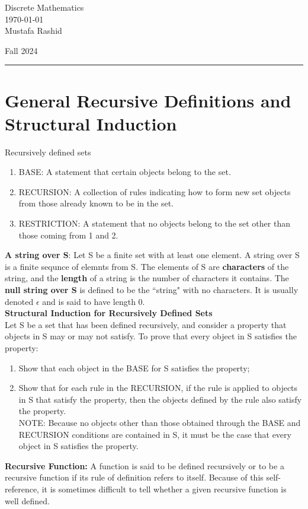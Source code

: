\documentclass[12pt,letterpaper, onecolumn]{exam}
\begin{document}
\begingroup  
\noindent\LARGE Discrete Mathematics\\
\noindent\large \today\\
\noindent\large Mustafa Rashid\par
\noindent\large Fall 2024\par
\endgroup
\rule{\textwidth}{0.4pt}
\pointsdroppedatright
\printanswers
\renewcommand{\solutiontitle}{\noindent\textbf{Ans:}\enspace}  


	\section{General Recursive Definitions and Structural Induction}
	Recursively defined sets 
	\begin{enumerate}
		\item BASE: A statement that certain objects belong to the set.
		\item RECURSION: A collection of rules indicating how to form new set objects from those already known to be in the set.
		\item RESTRICTION: A statement that no objects belong to the set other than those coming from 1 and 2.
	\end{enumerate}
	\textbf{A string over S}: Let S be a finite set with at least one element. A string over S is a finite sequnce of elemnts from S. The elements of S are \textbf{characters} of the string, and the \textbf{length} of a string is the number of characters it contains. The \textbf{null string over S} is defined to be the ``string" with no characters. It is usually denoted $\epsilon$ and is said to have length 0.\\
		\textbf{Structural Induction for Recursively Defined Sets}\\
		Let S be a set that has been defined recursively, and consider a property that objects in S may or may not satisfy. To prove that every object in S satisfies the property:
		\begin{enumerate}
			\item Show that each object in the BASE for S satisfies the property;
			\item Show that for each rule in the RECURSION, if the rule is applied to objects in S that satisfy the property, then the objects defined by the rule also satisfy the property.\\
			NOTE: Because no objects other than those obtained through the BASE and RECURSION conditions are contained in S, it must be the case that every object in S satisfies the property.
			\end{enumerate}
			\textbf{Recursive Function:} A function is said to be defined recursively or to be a recursive function if its rule of definition refers to itself. Because of this self-reference, it is sometimes difficult to tell whether a given recursive function is well defined.
\end{document}
